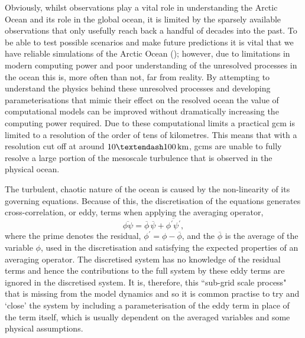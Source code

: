 \documentclass[10pt,a4paper]{article}
\begin{document}
 Obviously, whilst observations play a vital role in understanding the Arctic
 Ocean and its role in the global ocean, it is limited by the sparsely available
 observations that only usefully reach back a handful of decades into the past.
 To be able to test possible scenarios and make future predictions it is vital
 that we have reliable simulations of the Arctic Ocean (\cite{proshutinsky2008toward});
 however, due to limitations
 in modern computing power and poor understanding of the unresolved processes 
 in the ocean this is, more often than not, far from reality.
 By attempting  to understand the physics behind these unresolved processes 
 and developing parameterisations that mimic their effect on the resolved ocean
 the value of computational models can be improved without dramatically increasing the
 computing power required.  Due to these computational limits a practical \gls{gcm} is 
 limited to a  resolution of the order of tens of kilometres. This means that with a 
 resolution  cut off at around $10 \textendash 100 \, \rm km$, 
 \glspl{gcm} are unable to fully resolve a large portion of the mesoscale turbulence that is
 observed in the physical ocean.
 
 The turbulent, chaotic nature of the ocean is caused by the non-linearity of its 
 governing equations. Because of this,  the discretisation of the equations generates cross-correlation, or eddy, terms when applying the 
 averaging operator,
 \begin{equation}
 \overline{\phi\psi} = \overline{\phi}\,\overline{\psi} + 
 \overline{\phi^{\prime}\psi^{\prime}},
 \label{non-lin average}
 \end{equation}
 where the prime denotes the residual, ${\phi^{\prime} = \phi - \overline{\phi}}$,
 and the ${\overline{\phi}}$ is the average of the variable ${\phi}$, used in
 the discretisation and satisfying
 the expected properties of an averaging operator.
 The discretised system has no knowledge of the residual terms and hence
 the contributions to the full system by these eddy terms are
 ignored in the discretised system. It is, therefore, this ``sub-grid scale process"
 that is missing from the model dynamics and so it is common practise to try and
 `close' the system by including a parameterisation of the eddy
 term in place of the term itself, which is usually dependent on the averaged 
 variables and some physical assumptions.
 
\end{document}
